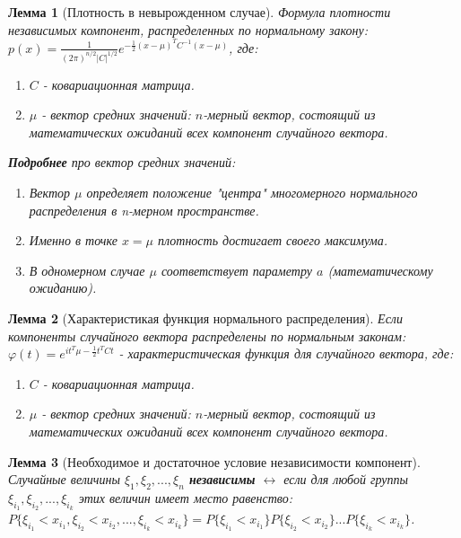 \documentclass[14pt]{extarticle}
\theoremstyle{breakstyle}
\newtheorem{lemma}{Лемма}[subsection]
\begin{document}
\begin{lemma}[Плотность в невырожденном случае]

Формула плотности независимых компонент, распределенных по нормальному закону:\\
$p(x) = \frac{1}{(2\pi)^{n/2}|C|^{1/2}} e^{-\frac{1}{2}(x-\mu)^TC^{-1}(x-\mu)}$, где:
\begin{enumerate}
    \item $C$ - ковариационная матрица.
    \item $\mu$ - вектор средних значений: $n$-мерный вектор, состоящий из математических ожиданий всех компонент случайного вектора.
\end{enumerate}

\vspace{\baselineskip}

\textbf{Подробнее} про вектор средних значений:
\begin{enumerate}
    \item Вектор $\mu$ определяет положение "центра" многомерного нормального распределения в n-мерном пространстве.
    \item Именно в точке $x = \mu$ плотность достигает своего максимума.
    \item В одномерном случае $\mu$ соответствует параметру $a$ (математическому ожиданию).
\end{enumerate}

\end{lemma}

\begin{lemma}[Характеристикая функция нормального распределения]

Если компоненты случайного вектора распределены по нормальным законам:\\
$\varphi(t) = e^{i t^T\mu - \frac{1}{2}t^TC t}$ - характеристическая функция для случайного вектора, где:
\begin{enumerate}
    \item $C$ - ковариационная матрица.
    \item $\mu$ - вектор средних значений: $n$-мерный вектор, состоящий из математических ожиданий всех компонент случайного вектора.
\end{enumerate}

\end{lemma}

\begin{lemma}[Необходимое и достаточное условие независимости компонент]

Случайные величины $\xi_{1}, \xi_{2}, ..., \xi_{n}$ \textbf{независимы} $\leftrightarrow$ если для любой группы $\xi_{i_{1}}, \xi_{i_{2}}, ..., \xi_{i_{k}}$ этих величин имеет место равенство:\\
$P\{\xi_{i_{1}} < x_{i_{1}}, \xi_{i_{2}} < x_{i_{2}}, ..., \xi_{i_{k}} < x_{i_{k}}\} = P\{\xi_{i_{1}} < x_{i_{1}}\}P\{\xi_{i_{2}} < x_{i_{2}}\}...P\{\xi_{i_{k}} < x_{i_{k}}\}$.

\end{lemma}
\end{document}
